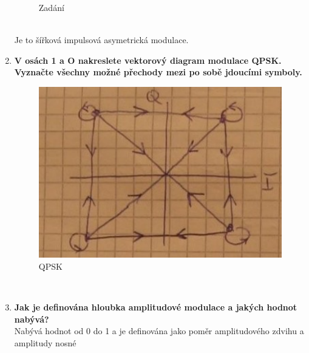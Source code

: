 \begin{enumerate}
\begin{figure}[h]
        \caption{Zadání}
    \end{figure}\\
    Je to šířková impulsová asymetrická modulace.
    \item \textbf{V osách 1 a O nakreslete vektorový diagram modulace QPSK. Vyznačte všechny možné
    přechody mezi po sobě jdoucími symboly.}
    \begin{figure}[h]
        \centering
        \includegraphics[scale = 0.5]{images/QPSKMal.png}
        \caption{QPSK}
    \end{figure}\\
    \item \textbf{Jak je definována hloubka amplitudové modulace a jakých hodnot nabývá?}\\
    Nabývá hodnot od 0 do 1 a je definována jako poměr amplitudového zdvihu a amplitudy nosné
\end{enumerate}

